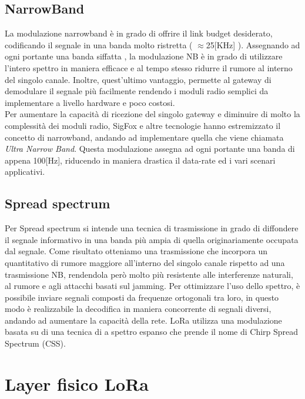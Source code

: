 \subsection{NarrowBand}
La modulazione narrowband è in grado di offrire il link budget desiderato,
codificando il segnale in una banda molto ristretta ( $\approx$25[KHz]
).  Assegnando ad ogni  portante una banda siffatta , la modulazione NB è in
grado di utilizzare l'intero spettro in maniera efficace e al tempo stesso 
ridurre il rumore al interno del singolo canale. Inoltre, quest'ultimo 
vantaggio, permette al gateway di demodulare il segnale più facilmente rendendo
i moduli radio semplici da implementare a livello hardware e poco costosi.\\
Per aumentare la capacità di ricezione
del  singolo gateway  e diminuire di molto la  complessità dei moduli radio,
SigFox e altre tecnologie hanno estremizzato il concetto di narrowband, andando ad
implementare quella che viene chiamata \emph{Ultra Narrow Band}.
Questa modulazione assegna ad ogni portante una banda di appena 100[Hz],
riducendo in maniera drastica il data-rate ed  i vari scenari applicativi. 

\subsection{Spread spectrum} 
Per  Spread spectrum si intende una tecnica di trasmissione
in grado di diffondere il segnale informativo in una banda più ampia di quella
originariamente occupata dal segnale. Come risultato otteniamo una trasmissione 
che incorpora un quantitativo di  rumore maggiore all'interno del singolo canale
rispetto ad una trasmissione NB,
rendendola però molto più resistente alle interferenze
naturali, al rumore e agli attacchi basati sul jamming.
Per ottimizzare l'uso dello spettro, è possibile inviare segnali composti da  
frequenze ortogonali tra loro, in questo modo è realizzabile la decodifica in maniera
concorrente di segnali diversi, andando ad aumentare la capacità della rete.
LoRa utilizza una  modulazione basata su di una tecnica di a 
spettro espanso che prende il nome di Chirp Spread Spectrum (CSS).
\section{Layer fisico LoRa}
